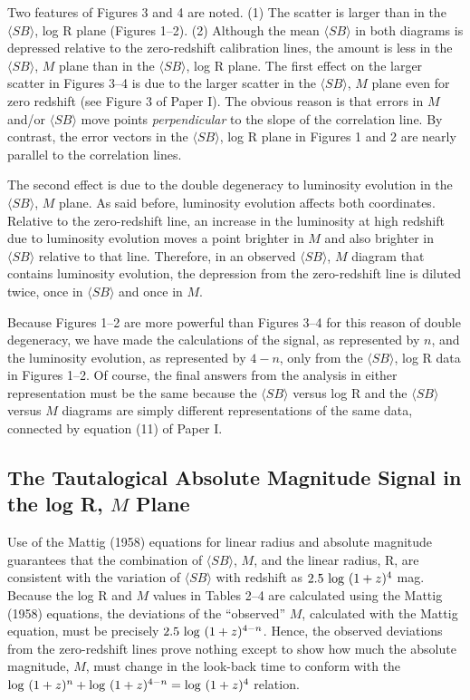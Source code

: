 \documentclass[preprint]{aastex}
\begin{document}
Two features of Figures 3 and 4 are noted. (1) The scatter is larger
than in the $\langle SB \rangle$, log R plane (Figures 1--2). (2)
Although the mean $\langle SB \rangle$ in both diagrams is depressed
relative to the zero-redshift calibration lines, the amount is less in
the $\langle SB \rangle$, $M$ plane than in the $\langle SB \rangle$,
log R plane. The first effect on the larger scatter in Figures 3--4 is
due to the larger scatter in the $\langle SB \rangle$, $M$ plane even
for zero redshift (see Figure 3 of Paper I). The obvious reason is
that errors in $M$ and/or $\langle SB \rangle$ move points {\it
perpendicular} to the slope of the correlation line. By contrast, the
error vectors in the $\langle SB \rangle$, log R plane in Figures 1
and 2 are nearly parallel to the correlation lines.

The second effect is due to the double degeneracy to luminosity
evolution in the $\langle SB \rangle$, $M$ plane. As said before,
luminosity evolution affects both coordinates.  Relative to the
zero-redshift line, an increase in the luminosity at high redshift due
to luminosity evolution moves a point brighter in $M$ and also
brighter in $\langle SB \rangle$ relative to that line.  Therefore, in
an observed $\langle SB \rangle$, $M$ diagram that contains luminosity
evolution, the depression from the zero-redshift line is diluted
twice, once in $\langle SB \rangle$ and once in $M$.

Because Figures 1--2 are more powerful than Figures 3--4 for this
reason of double degeneracy, we have made the calculations of the
signal, as represented by $n$, and the luminosity evolution, as
represented by $4-n$, only from the $\langle SB \rangle$, log R data
in Figures 1--2. Of course, the final answers from the analysis in
either representation must be the same because the $\langle SB
\rangle$ versus log R and the $\langle SB \rangle$ versus $M$ diagrams
are simply different representations of the same data, connected by
equation (11) of Paper I.

\subsection{The Tautalogical Absolute Magnitude Signal in the 
log R, $M$ Plane} 

Use of the Mattig (1958) equations for linear radius and absolute
magnitude guarantees that the combination of $\langle SB \rangle$,
$M$, and the linear radius, R, are consistent with the variation of
$\langle SB \rangle$ with redshift as $2.5~{\rm log}~(1+ z)^4$ mag.
Because the log R and $M$ values in Tables 2--4 are calculated using
the Mattig (1958) equations, the deviations of the ``observed'' $M$,
calculated with the Mattig equation, must be precisely $2.5~{\rm
log}~(1 + z)^{4-n}$. Hence, the observed deviations from the
zero-redshift lines prove nothing except to show how much the absolute
magnitude, $M$, must change in the look-back time to conform with the
${\rm log}~(1+z)^n + {\rm log}~(1+z)^{4-n} = {\rm log}~(1+z)^4$
relation.
\end{document}
